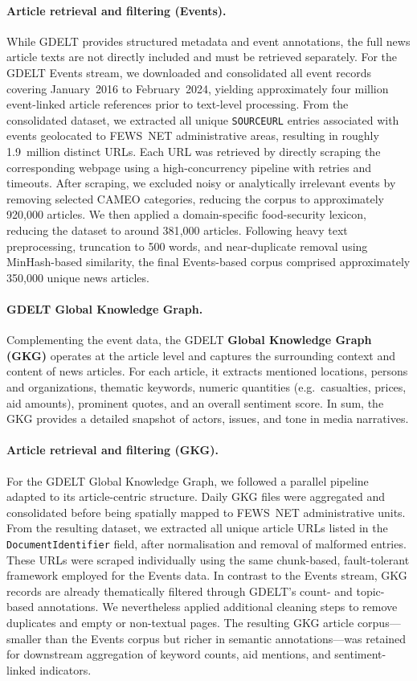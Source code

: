 \documentclass{article}
\begin{document}
\paragraph{Article retrieval and filtering (Events).}
While GDELT provides structured metadata and event annotations, the full news article texts are not directly included and must be retrieved separately. For the GDELT Events stream, we downloaded and consolidated all event records covering January~2016 to February~2024, yielding approximately four million event-linked article references prior to text-level processing. From the consolidated dataset, we extracted all unique \texttt{SOURCEURL} entries associated with events geolocated to FEWS~NET administrative areas, resulting in roughly 1.9~million distinct URLs. Each URL was retrieved by directly scraping the corresponding webpage using a high-concurrency pipeline with retries and timeouts. After scraping, we excluded noisy or analytically irrelevant events by removing selected CAMEO categories, reducing the corpus to approximately 920{,}000 articles. We then applied a domain-specific food-security lexicon, reducing the dataset to around 381{,}000 articles. Following heavy text preprocessing, truncation to 500 words, and near-duplicate removal using MinHash-based similarity, the final Events-based corpus comprised approximately 350{,}000 unique news articles.

\paragraph{GDELT Global Knowledge Graph.}
Complementing the event data, the GDELT \textbf{Global Knowledge Graph (GKG)} operates at the article level and captures the surrounding context and content of news articles. For each article, it extracts mentioned locations, persons and organizations, thematic keywords, numeric quantities (e.g.\ casualties, prices, aid amounts), prominent quotes, and an overall sentiment score. In sum, the GKG provides a detailed snapshot of actors, issues, and tone in media narratives.

\paragraph{Article retrieval and filtering (GKG).}
For the GDELT Global Knowledge Graph, we followed a parallel pipeline adapted to its article-centric structure. Daily GKG files were aggregated and consolidated before being spatially mapped to FEWS~NET administrative units. From the resulting dataset, we extracted all unique article URLs listed in the \texttt{DocumentIdentifier} field, after normalisation and removal of malformed entries. These URLs were scraped individually using the same chunk-based, fault-tolerant framework employed for the Events data. In contrast to the Events stream, GKG records are already thematically filtered through GDELT’s count- and topic-based annotations. We nevertheless applied additional cleaning steps to remove duplicates and empty or non-textual pages. The resulting GKG article corpus---smaller than the Events corpus but richer in semantic annotations---was retained for downstream aggregation of keyword counts, aid mentions, and sentiment-linked indicators.
\end{document}
